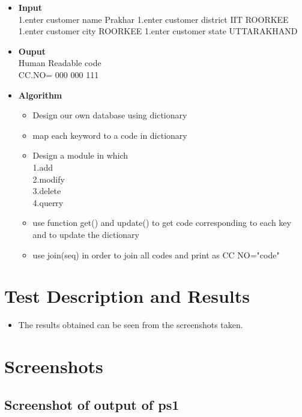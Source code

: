 \documentclass[12pt,a4paper]{article}
\begin{document}
{{{\begin{itemize}
\bigskip

\bigskip
 
\item{\textbf{Input}}\\
1.enter customer name Prakhar
1.enter customer district IIT ROORKEE
1.enter customer city ROORKEE
1.enter customer state UTTARAKHAND
  

\item{\textbf{Ouput}}\\
Human Readable code\\
CC.NO= 000 000 111





\item{\textbf{Algorithm}}
\begin{itemize}
\item{ Design our own database using dictionary}
\item{map each keyword to a code in dictionary}
\item{ Design a module in which\\
1.add\\
2.modify\\
3.delete\\
4.querry\\}
\item{ use function get() and update() to get code corresponding to each key and to update the dictionary  }
\item{ use join(seq) in order to join all codes and print as CC NO="code"} 

\end{itemize}
\end{itemize}
\centering

\newpage
\section{Test Description and Results}
\begin{itemize}
\item The results obtained can be seen from the screenshots taken.

\end{itemize} 

\newpage
\section{Screenshots}
\flushleft

\subsection{Screenshot of output of ps1}


}}}
\end{document}
